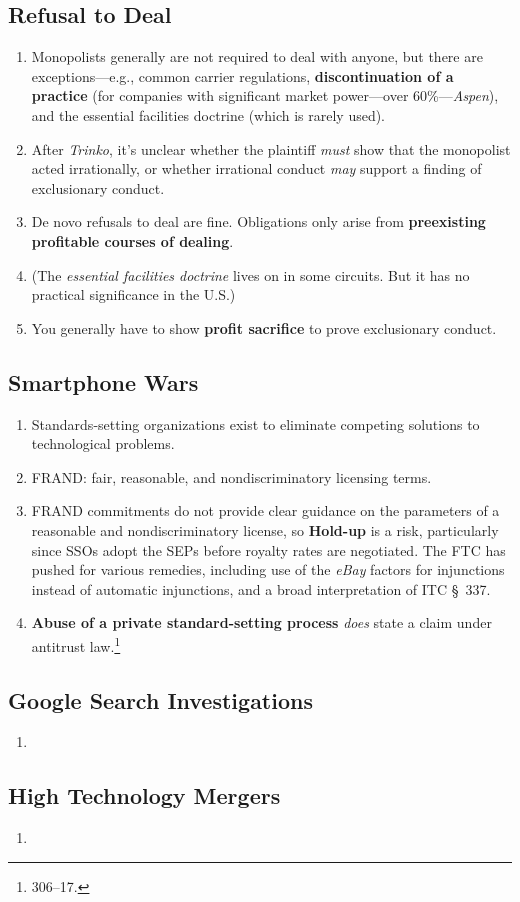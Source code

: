 \subsection{Refusal to Deal}

\begin{enumerate}
    \item Monopolists generally are not required to deal with anyone, but 
    there are exceptions---e.g., common carrier regulations, 
    \textbf{discontinuation of a practice} (for companies with significant 
    market power---over 60\%---\emph{Aspen}), and the essential facilities 
    doctrine (which is rarely used).
    \item After \emph{Trinko}, it's unclear whether the plaintiff \emph{must} 
    show that the monopolist acted irrationally, or whether irrational conduct 
    \emph{may} support a finding of exclusionary conduct.
    \item De novo refusals to deal are fine. Obligations only arise from 
    \textbf{preexisting profitable courses of dealing}.
    \item (The \emph{essential facilities doctrine} lives on in some circuits. 
    But it has no practical significance in the U.S.)
    \item You generally have to show \textbf{profit sacrifice} to prove 
    exclusionary conduct.
\end{enumerate}

\subsection{Smartphone Wars} %

\begin{enumerate}
    \item Standards-setting organizations exist to eliminate competing 
    solutions to technological problems.
    \item FRAND: fair, reasonable, and nondiscriminatory licensing terms.
    \item FRAND commitments do not provide clear guidance on the parameters of 
    a reasonable and nondiscriminatory license, so \textbf{Hold-up} is a risk, 
    particularly since SSOs adopt the SEPs before royalty rates are 
    negotiated. The FTC has pushed for various remedies, including use of the 
    \emph{eBay} factors for injunctions instead of automatic injunctions, and 
    a broad interpretation of ITC \S\ 337.
    \item \textbf{Abuse of a private standard-setting process} \emph{does} 
    state a claim under antitrust law.\footnote{306--17.}
\end{enumerate}

\subsection{Google Search Investigations} %

\begin{enumerate}
    \item 
\end{enumerate}

\subsection{High Technology Mergers} %

\begin{enumerate}
    \item 
\end{enumerate}
